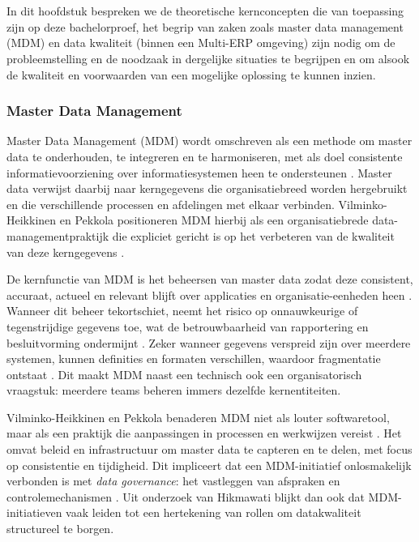 \chapter{}%
\label{ch:stand-van-zaken}

In dit hoofdstuk bespreken we de theoretische kernconcepten die van toepassing zijn op deze bachelorproef, het begrip van zaken zoals master data management (MDM) en data kwaliteit (binnen een Multi-ERP omgeving) zijn nodig om de probleemstelling en de noodzaak in dergelijke situaties te begrijpen en om alsook de kwaliteit en voorwaarden van een mogelijke oplossing te kunnen inzien. 


\subsection{Master Data Management}
Master Data Management (MDM) wordt omschreven als een methode om master data te onderhouden, te integreren en te harmoniseren, met als doel consistente informatievoorziening over informatiesystemen heen te ondersteunen \autocite{Hikmawati}. Master data verwijst daarbij naar kerngegevens die organisatiebreed worden hergebruikt en die verschillende processen en afdelingen met elkaar verbinden. Vilminko-Heikkinen en Pekkola positioneren MDM hierbij als een organisatiebrede data-managementpraktijk die expliciet gericht is op het verbeteren van de kwaliteit van deze kerngegevens \autocite{VilminkoHeikkinenPekkola2019}.

De kernfunctie van MDM is het beheersen van master data zodat deze consistent, accuraat, actueel en relevant blijft over applicaties en organisatie-eenheden heen \autocite{Hikmawati}. Wanneer dit beheer tekortschiet, neemt het risico op onnauwkeurige of tegenstrijdige gegevens toe, wat de betrouwbaarheid van rapportering en besluitvorming ondermijnt \autocite{Hikmawati}. Zeker wanneer gegevens verspreid zijn over meerdere systemen, kunnen definities en formaten verschillen, waardoor fragmentatie ontstaat \autocite{VilminkoHeikkinenPekkola2019}. Dit maakt MDM naast een technisch ook een organisatorisch vraagstuk: meerdere teams beheren immers dezelfde kernentiteiten.

Vilminko-Heikkinen en Pekkola benaderen MDM niet als louter softwaretool, maar als een praktijk die aanpassingen in processen en werkwijzen vereist \autocite{VilminkoHeikkinenPekkola2019}. Het omvat beleid en infrastructuur om master data te capteren en te delen, met focus op consistentie en tijdigheid. Dit impliceert dat een MDM-initiatief onlosmakelijk verbonden is met \emph{data governance}: het vastleggen van afspraken en controlemechanismen \autocite{Hikmawati}. Uit onderzoek van Hikmawati blijkt dan ook dat MDM-initiatieven vaak leiden tot een hertekening van rollen om datakwaliteit structureel te borgen.

